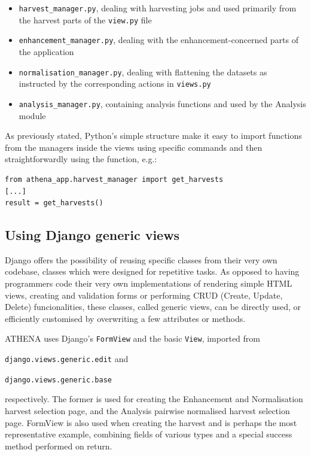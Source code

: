 \documentclass[12pt,a4paper,twoside]{report}
\begin{document}
\begin{itemize}
\item \texttt{harvest\_manager.py}, dealing with harvesting jobs and used primarily from the harvest parts of the \texttt{view.py} file
\item \texttt{enhancement\_manager.py}, dealing with the enhancement-concerned parts of the application
\item \texttt{normalisation\_manager.py}, dealing with flattening the datasets as instructed by the corresponding actions in \texttt{views.py}
\item \texttt{analysis\_manager.py}, containing analysis functions and used by the Analysis module
\end{itemize}

As previously stated, Python's simple structure make it easy to import functions from the managers inside the views using specific commands and then straightforwardly using the function, e.g.:

\begin{lstlisting}
from athena_app.harvest_manager import get_harvests
[...]
result = get_harvests()
\end{lstlisting}

\subsection{Using Django generic views}
Django offers the possibility of reusing specific classes from their very own codebase, classes which were designed for repetitive tasks. As opposed to having programmers code their very own implementations of rendering simple HTML views, creating and validation forms or performing CRUD (Create, Update, Delete) funcionalities, these classes, called generic views, can be directly used, or efficiently customised by overwriting a few attributes or methods.

ATHENA uses Django's \texttt{FormView} and the basic \texttt{View}, imported from

\texttt{django.views.generic.edit} and 

\texttt{django.views.generic.base}

respectively. The former is used for creating the Enhancement and Normalisation harvest selection page, and the Analysis pairwise normalised harvest selection page. FormView is also used when creating the harvest and is perhaps the most representative example, combining fields of various types and a special success method performed on return.
\end{document}
